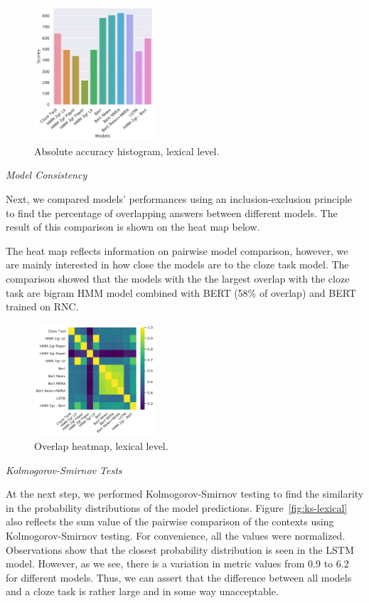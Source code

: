 \documentclass[a4paper]{article}
\newcommand{\head}[1]{\vspace{0.5em}\emph{#1}\vspace{0.25em}}
\begin{document}
\begin{figure}
\caption{Absolute accuracy histogram, lexical level.}
\label{fig:abs-accuracy-hist-lex}
\centering
\includegraphics[width=0.4\textwidth]{figures/pdf/abs-accuracy-hist-lex.pdf}
\end{figure}

\head{Model Consistency}

Next, we compared models’ performances using an inclusion-exclusion principle to find the percentage of overlapping answers between different models. The result of this comparison is shown on the heat map below.

The heat map reflects information on pairwise model comparison,
however, we are mainly interested in how close the models are to the
cloze task model. The comparison showed that the models with the
the largest overlap with the cloze task are bigram HMM model combined
with BERT (58\% of overlap) and BERT trained on RNC.

\begin{figure}
\caption{Overlap heatmap, lexical level.}
\label{fig:heatmap-context-accord-lex}
\centering
\includegraphics[width=0.4\textwidth]{figures/pdf/heatmap-context-accord-lex.pdf}
\end{figure}

\head{Kolmogorov-Smirnov Tests}

At the next step, we performed Kolmogorov-Smirnov testing to find the similarity in the probability distributions of the model predictions. Figure~\ref{fig:ks-lexical} also reflects the sum value of the pairwise comparison of the contexts using Kolmogorov-Smirnov testing. For convenience, all the values were normalized. Observations show that the closest probability distribution is seen in the LSTM model. However, as we see, there is a variation in metric values from 0.9 to 6.2 for different models. Thus, we can assert that the difference between all models and a cloze task is rather large and in some way unacceptable.
\end{document}

